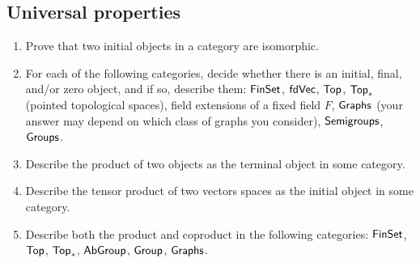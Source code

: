 \documentclass[12pt]{amsart}
\begin{document}
\subsection{Universal properties}
\begin{enumerate}
\item Prove that two initial objects in a category are isomorphic.
\item For each of the following categories, decide whether there is an initial, final, and/or zero object, and if so, describe them:
$\sf{FinSet}$, $\sf{fdVec}$, $\sf{Top}$, $\sf{Top}_*$ (pointed topological spaces), field extensions of a fixed field $F$, $\sf{Graphs}$ (your answer may depend on which class of graphs you consider), $\sf{Semigroups}$, $\sf{Groups}$.
\item Describe the product of two objects as the terminal object in some category.
\item Describe the tensor product of two vectors spaces as the initial object in some category.
\item Describe both the product and coproduct in the following categories: $\sf{FinSet}$, $\sf{Top}$, $\sf{Top}_*$, $\sf{AbGroup}$, $\sf{Group}$, $\sf{Graphs}$.
\end{enumerate}


\end{document}
